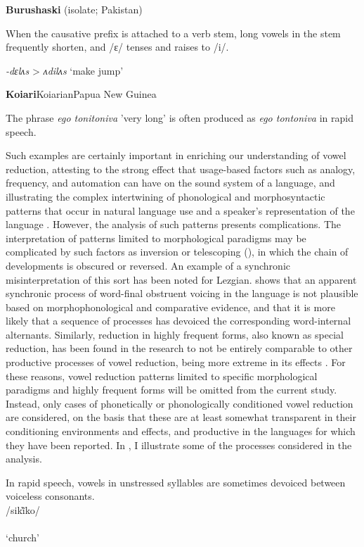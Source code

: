 \ea\label{ex:6.4}
   \textbf{Burushaski} (isolate; Pakistan)

When the causative prefix is attached to a verb stem, long vowels in the stem frequently shorten, and /ɛ/ tenses and raises to /i/.

\textit{-dɛlʌs} > \textit{ʌdilʌs} ‘make jump’
\citep[1030]{Anderson1997}
\z

\ea\label{ex:6.5}
 \textbf{Koiari}{Koiarian}{Papua New Guinea}

The phrase \textit{ego tonitoniva} ’very long’ is often produced as \textit{ego tontoniva} in rapid speech.
\citep[7]{Dutton1996}
\z

  Such examples are certainly important in enriching our understanding of vowel reduction, attesting to the strong effect that usage-based factors such as analogy, frequency, and automation can have on the sound system of a language, and illustrating the complex intertwining of phonological and morphosyntactic patterns that occur in natural language use and a speaker’s representation of the language \citep{Bybee2001}. However, the analysis of such patterns presents complications. The interpretation of patterns limited to morphological paradigms may be complicated by such factors as inversion or telescoping (\citealt{Vennemann1972,Hyman1975}), in which the chain of developments is obscured or reversed. An example of a synchronic misinterpretation of this sort has been noted for Lezgian. \citet{Yu2004} shows that an apparent synchronic process of word-final obstruent voicing in the language is not plausible based on morphophonological and comparative evidence, and that it is more likely that a sequence of processes has devoiced the corresponding word-internal alternants. Similarly, reduction in highly frequent forms, also known as special reduction, has been found in the research to not be entirely comparable to other productive processes of vowel reduction, being more extreme in its effects \citep{BybeeEtAl2016}. For these reasons, vowel reduction patterns limited to specific morphological paradigms and highly frequent forms will be omitted from the current study. Instead, only cases of phonetically or phonologically conditioned vowel reduction are considered, on the basis that these are at least somewhat transparent in their conditioning environments and effects, and productive in the languages for which they have been reported. In , I illustrate some of the processes considered in the analysis.

\ea\label{ex:6.6}
In rapid speech, vowels in unstressed syllables are sometimes devoiced between voiceless consonants.\\
/sik\`{ĩ}ko/\\\relax
[si̥k\`{ĩ}ko]\\
\glt ‘church’
\citep[18]{Holt1999}
\z

